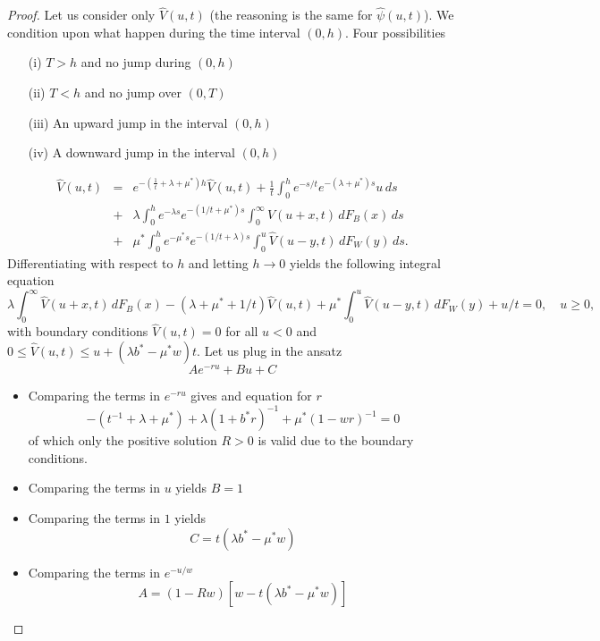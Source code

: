 \begin{proof}
Let us consider only $\widehat{V}(u,t)$ (the reasoning is the same for $\widehat{\psi}(u,t)$).
We condition upon what happen during the time interval $(0,h)$. Four possibilities
\begin{itemize}
  \item[(i)] $T>h$ and no jump during $(0,h)$
  \item[(ii)] $T<h$ and no jump over $(0,T)$
  \item[(iii)] An upward jump in the interval $(0,h)$
  \item[(iv)] A downward jump in the interval $(0,h)$
\end{itemize}
  \begin{eqnarray*}\label{neu0}
      \widehat{V}(u,t)&=& e^{-(\frac{1}{t}+\lambda+\mu^\ast)h}\widehat{V}(u,t) + \frac{1}{t}\int_0^h e^{-{s}/{t}}e^{-(\lambda +\mu^\ast) s} u\,ds\\
      & +& \lambda\int_0^he^{-\lambda s} e^{-({1}/{t}+\mu^\ast) s} \int_0^\infty\widehat{V}(u+x,t)\,dF_{B}(x)\,ds\\
      &  +&\mu^\ast \int_0^he^{-\mu^\ast s} e^{-({1}/{t}+\lambda) s}\int_0^u \widehat{V}(u-y,t) \,dF_W(y)\,ds.
  \end{eqnarray*}
  Differentiating with respect to $h$ and letting $h\rightarrow 0$ yields the following integral equation
  \begin{equation} \label{inteq}
    \lambda\int_0^\infty\widehat{V}(u+x,t)\,dF_{B}(x)-(\lambda+\mu^\ast+{1}/{t})\widehat{V}(u,t)+\mu^\ast\int_0^u \widehat{V}(u-y,t) \,dF_W(y)+{u}/{t}=0,\quad u\ge 0,
  \end{equation}
  with boundary conditions $\widehat{V}(u,t)=0$ for all $u<0$ and $0\leq\widehat{V}(u,t)\leq u+(\lambda b^\ast - \mu^\ast w)t$. Let us plug in the ansatz
  $$
  Ae^{-ru}+Bu+C
  $$
  \begin{itemize}
    \item Comparing the terms in $e^{-r u}$ gives and equation for $r$
    $$
    -(t^{-1}+\lambda+\mu^\ast)+\lambda(1+b^\ast r)^{-1}+\mu^\ast(1-wr)^{-1}=0
    $$
    of which only the positive solution $R>0$ is valid due to the boundary conditions.
    \item Comparing the terms in $u$ yields $B = 1$
    \item Comparing the terms in $1$ yields
    $$
    C = t(\lambda b^\ast-\mu^\ast w)
    $$
    \item Comparing the terms in $e^{-u/w}$
    $$
    A = (1 - Rw)[w-t(\lambda b^\ast-\mu^\ast w)]
    $$
\end{itemize}
\end{proof}

